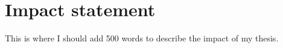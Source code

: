 \chapter*{Impact statement}

This is where I should add 500 words to describe the impact of my thesis.